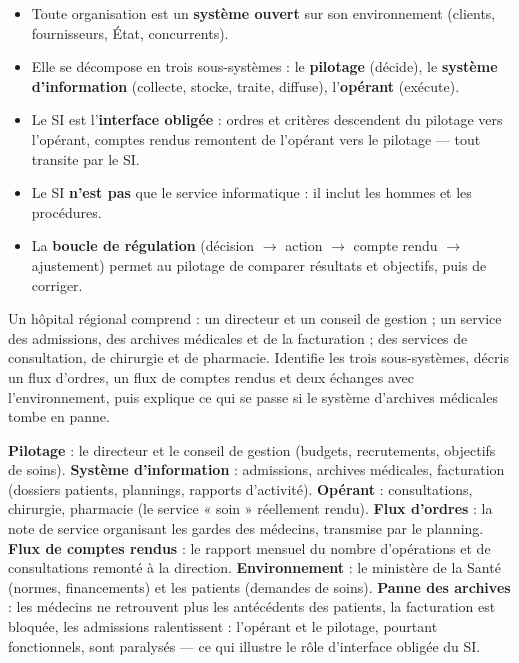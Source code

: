 \documentclass[11pt]{article}
\begin{document}
\begin{aretenir}
\begin{itemize}
  \item Toute organisation est un \textbf{système ouvert} sur son environnement (clients, fournisseurs, État, concurrents).
  \item Elle se décompose en trois sous-systèmes : le \textbf{pilotage} (décide), le \textbf{système d'information} (collecte, stocke, traite, diffuse), l'\textbf{opérant} (exécute).
  \item Le SI est l'\textbf{interface obligée} : ordres et critères descendent du pilotage vers l'opérant, comptes rendus remontent de l'opérant vers le pilotage — tout transite par le SI.
  \item Le SI \textbf{n'est pas} que le service informatique : il inclut les hommes et les procédures.
  \item La \textbf{boucle de régulation} (décision $\rightarrow$ action $\rightarrow$ compte rendu $\rightarrow$ ajustement) permet au pilotage de comparer résultats et objectifs, puis de corriger.
\end{itemize}
\end{aretenir}

\begin{exercice}
Un hôpital régional comprend : un directeur et un conseil de gestion ; un service des admissions, des archives médicales et de la facturation ; des services de consultation, de chirurgie et de pharmacie. Identifie les trois sous-systèmes, décris un flux d'ordres, un flux de comptes rendus et deux échanges avec l'environnement, puis explique ce qui se passe si le système d'archives médicales tombe en panne.
\end{exercice}

\begin{corrige}
\textbf{Pilotage} : le directeur et le conseil de gestion (budgets, recrutements, objectifs de soins). \textbf{Système d'information} : admissions, archives médicales, facturation (dossiers patients, plannings, rapports d'activité). \textbf{Opérant} : consultations, chirurgie, pharmacie (le service « soin » réellement rendu). \textbf{Flux d'ordres} : la note de service organisant les gardes des médecins, transmise par le planning. \textbf{Flux de comptes rendus} : le rapport mensuel du nombre d'opérations et de consultations remonté à la direction. \textbf{Environnement} : le ministère de la Santé (normes, financements) et les patients (demandes de soins). \textbf{Panne des archives} : les médecins ne retrouvent plus les antécédents des patients, la facturation est bloquée, les admissions ralentissent : l'opérant et le pilotage, pourtant fonctionnels, sont paralysés — ce qui illustre le rôle d'interface obligée du SI.
\end{corrige}
\end{document}
